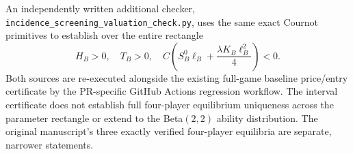 An independently written additional checker, \texttt{incidence\_screening\_valuation\_check.py}, uses the same exact Cournot primitives to establish over the entire rectangle
\[
 H_B>0,\quad T_B>0,\quad
 C\left(S_B^0\ell_B+\frac{\lambda K_B\ell_B^2}{4}\right)<0.
\]
Both sources are re-executed alongside the existing full-game baseline price/entry certificate by the PR-specific GitHub Actions regression workflow. The interval certificate does not establish full four-player equilibrium uniqueness across the parameter rectangle or extend to the Beta$(2,2)$ ability distribution. The original manuscript's three exactly verified four-player equilibria are separate, narrower statements.
